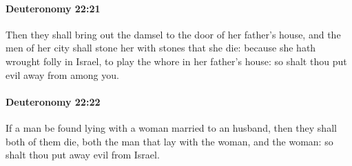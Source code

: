 		\paragraph{Deuteronomy 22:21} %
			\label{DEUTERONOMY-22-21}

			Then they shall bring out the damsel to the door of her father's house, and the men of her city shall stone her with stones that she die: because she hath wrought folly in Israel, to play the whore in her father's house: so shalt thou put evil away from among you.


		\paragraph{Deuteronomy 22:22} %
			\label{DEUTERONOMY-22-22}

			If a man be found lying with a woman married to an husband, then they shall both of them die, both the man that lay with the woman, and the woman: so shalt thou put away evil from Israel.

